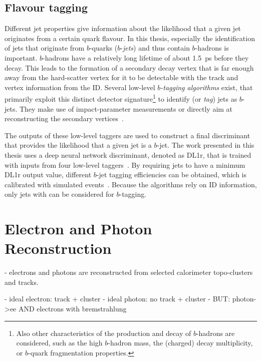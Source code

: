\subsection{Flavour tagging}
Different jet properties give information about the likelihood that a given jet originates from a certain quark flavour. 
In this thesis, especially the identification of jets that originate from $b$-quarks ($b$-\emph{jets}) and thus contain $b$-hadrons is important. $b$-hadrons have a relatively long lifetime of about \SI{1.5}{\pico\second} before they decay. This leads to the formation of a secondary decay vertex that is far enough away from the hard-scatter vertex for it to be detectable with the track and vertex information from the ID. 
Several low-level \emph{$b$-tagging algorithms} exist, that primarily exploit this distinct detector signature\footnote{Also other characteristics of the production and decay of $b$-hadrons are considered, such as the high $b$-hadron mass, the (charged) decay multiplicity, or $b$-quark fragmentation properties.} to identify (or \emph{tag}) jets as $b$-jets. They make use of impact-parameter measurements or directly aim at reconstructing the secondary vertices~\cite{ATL-PHYS-PUB-2017-013}.

The outputs of these low-level taggers are used to construct a final discriminant that provides the likelihood that a given jet is a $b$-jet. The work presented in this thesis uses a deep neural network discriminant, denoted as DL1r, that is trained with inputs from four low-level taggers~\cite{ATL-PHYS-PUB-2017-013}.
By requiring jets to have a minimum DL1r output value, different $b$-jet tagging efficiencies can be obtained, which is calibrated with simulated \ttbar events~\cite{FTAG-2018-01}. 
Because the algorithms rely on ID information, only jets with  can be considered for $b$-tagging.



\section{Electron and Photon Reconstruction}
\label{sec:electron-photon-reconstruction}

- electrons and photons are reconstructed from selected calorimeter topo-clusters and tracks.

- ideal electron: track + cluster
- ideal photon: no track + cluster
- BUT: photon->ee AND electrons with bremstrahlung

